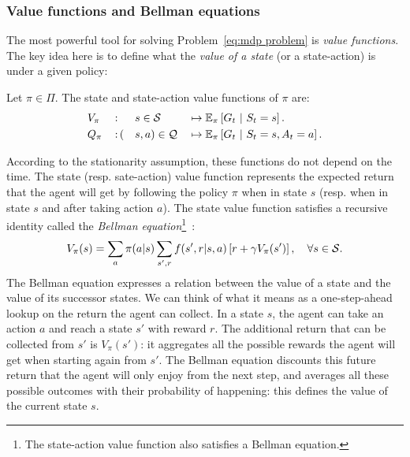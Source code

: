 		\subsubsection{Value functions and Bellman equations} 
			The most powerful tool for solving Problem~\eqref{eq:mdp problem} is\emph{ value functions}. The key idea here is to define what the\emph{ value of a state} (or a state-action) is under a given policy:
			\begin{definition}
				Let $\pi\in\Pi$. The state and state-action value functions of $\pi$ are:
				\begin{alignat}{7}
				& V_\pi\,&:&\, &s&\in\S & & \mapsto \expected_\pi\left[G_t~\middle|~S_t = s\right]. \label{eq:state value} \\
				& Q_\pi\,&:&\, (&s&, a)\in\Q & & \mapsto \expected_\pi\left[G_t~\middle|~S_t = s, A_t = a\right]. \label{eq:stateaction value}
				\end{alignat}
			\end{definition}
			According to the stationarity assumption, these functions do not depend on the time. The state (resp. sate-action) value function represents the expected return that the agent will get by following the policy $\pi$ when in state $s$ (resp. when in state $s$ and after taking action $a$). The state value function satisfies a recursive identity called the\emph{ Bellman equation}\footnote{The state-action value function also satisfies a Bellman equation.}~\cite[Section\,3.5]{sutton2018reinforcement}:
			\begin{equation}
				V_\pi(s) = \sum_{a} \pi(a|s) \sum_{s', r}f(s', r |s, a)\left[r + \gamma V_\pi(s')\right],\quad \forall s\in\S. \label{eq:bellman}
			\end{equation}
			The Bellman equation expresses a relation between the value of a state and the value of its successor states. We can think of what it means as a one-step-ahead lookup on the return the agent can collect. In a state $s$, the agent can take an action $a$ and reach a state $s'$ with reward $r$. The additional return that can be collected from $s'$ is $V_\pi(s')$: it aggregates all the possible rewards the agent will get when starting again from $s'$. The Bellman equation discounts this future return that the agent will only enjoy from the next step, and averages all these possible outcomes with their probability of happening: this defines the value of the current state $s$.
